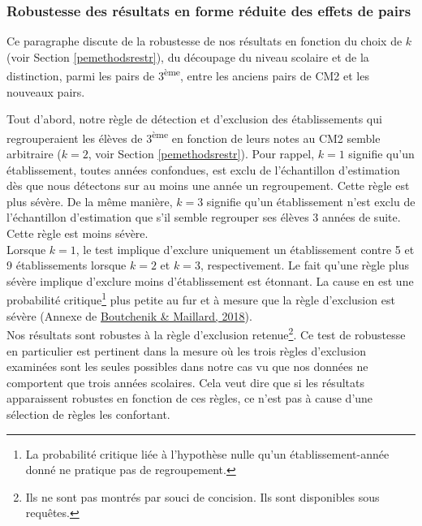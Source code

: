 \documentclass[
]{book}
\begin{document}
\hypertarget{peresfrrob}{%
\subsubsection{Robustesse des résultats en forme réduite des effets de pairs}\label{peresfrrob}}

Ce paragraphe discute de la robustesse de nos résultats en fonction du choix de \(k\) (voir Section \ref{pemethodsrestr}), du découpage du niveau scolaire et de la distinction, parmi les pairs de 3\textsuperscript{ème}, entre les anciens pairs de CM2 et les nouveaux pairs.

\quad Tout d'abord, notre règle de détection et d'exclusion des établissements qui regrouperaient les élèves de 3\textsuperscript{ème} en fonction de leurs notes au CM2 semble arbitraire (\(k = 2\), voir Section \ref{pemethodsrestr}). Pour rappel, \(k = 1\) signifie qu'un établissement, toutes années confondues, est exclu de l'échantillon d'estimation dès que nous détectons sur au moins une année un regroupement. Cette règle est plus sévère. De la même manière, \(k = 3\) signifie qu'un établissement n'est exclu de l'échantillon d'estimation que s'il semble regrouper ses élèves 3 années de suite. Cette règle est moins sévère.\\
Lorsque \(k = 1\), le test implique d'exclure uniquement un établissement contre 5 et 9 établissements lorsque \(k = 2\) et \(k = 3\), respectivement. Le fait qu'une règle plus sévère implique d'exclure moins d'établissement est étonnant. La cause en est une probabilité critique\footnote{La probabilité critique liée à l'hypothèse nulle qu'un établissement-année donné ne pratique pas de regroupement.} plus petite au fur et à mesure que la règle d'exclusion est sévère (Annexe de \protect\hyperlink{ref-BOU:MAI:18}{Boutchenik \& Maillard, 2018}).\\
Nos résultats sont robustes à la règle d'exclusion retenue\footnote{Ils ne sont pas montrés par souci de concision. Ils sont disponibles sous requêtes.}. Ce test de robustesse en particulier est pertinent dans la mesure où les trois règles d'exclusion examinées sont les seules possibles dans notre cas vu que nos données ne comportent que trois années scolaires. Cela veut dire que si les résultats apparaissent robustes en fonction de ces règles, ce n'est pas à cause d'une sélection de règles les confortant.
\end{document}
